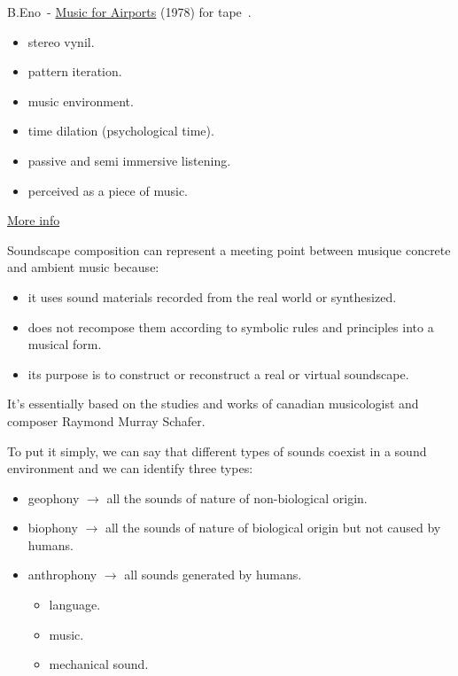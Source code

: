 B.Eno~- \href{http://www.musicaecodice.it/on_server/media/2_media/eno.mp3}{Music for Airports} (1978) for tape~\cite{eno}.

\begin{itemize}
\tightlist\item stereo vynil. 
\item pattern iteration.
\item music environment. 
\item time dilation (psychological time). 
\item passive and semi immersive listening. 
\item perceived as a piece of music.
\end{itemize}

\href{http://www.musicaecodice.it/on_server/media/2_media/eno.pdf}{More info}

Soundscape composition can represent a meeting point between musique concrete and ambient music because:

\begin{itemize}
\tightlist\item it uses sound materials recorded from the real world or synthesized.
\item does not recompose them according to symbolic rules and principles into a musical form.
\item its purpose is to construct or reconstruct a real or virtual soundscape.
\end{itemize}

It's essentially based on the studies and works of canadian musicologist and composer Raymond Murray Schafer.

To put it simply, we can say that different types of sounds coexist in a sound environment and we can identify three types:

\begin{itemize}
\tightlist\item geophony \(\rightarrow\) all the sounds of nature of non-biological origin.
\item biophony \(\rightarrow\) all the sounds of nature of biological origin but not caused by humans.
\item anthrophony \(\rightarrow\) all sounds generated by humans.
  \begin{itemize}
  \tightlist\item language.
  \item music.
  \item mechanical sound.
  \end{itemize}
\end{itemize}

